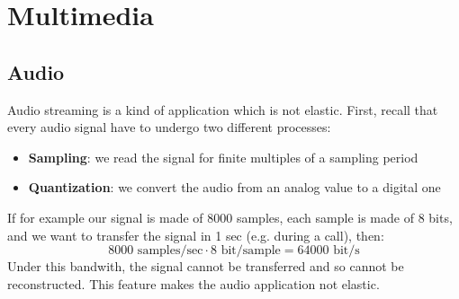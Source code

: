 \section{Multimedia}
\subsection{Audio}
Audio streaming is a kind of application which is not elastic. First, recall that every audio signal have to undergo two different processes:
\begin{itemize}
    \item \textbf{Sampling}: we read the signal for finite multiples of a sampling period
    \item \textbf{Quantization}: we convert the audio from an analog value to a digital one
\end{itemize}
\noindent If for example our signal is made of 8000 samples, each sample is made of 8 bits, and we want to transfer the signal in 1 sec (e.g. during a call), then:
\[8000 \text{ samples/sec}\cdot 8\text{ bit/sample}=64000\text{ bit/s}\]
\noindent Under this bandwith, the signal cannot be transferred and so cannot be reconstructed. This feature makes the audio application not elastic.